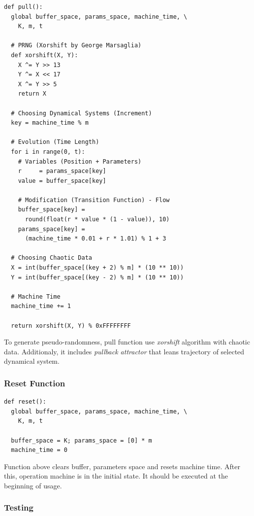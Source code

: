 \documentclass[twocolumn, a4paper, 10pt]{article}
\begin{document}
\begin{lstlisting}[style=codeAppendix, numbers=none]
def pull():
  global buffer_space, params_space, machine_time, \
    K, m, t

  # PRNG (Xorshift by George Marsaglia)
  def xorshift(X, Y):
    X ^= Y >> 13
    Y ^= X << 17
    X ^= Y >> 5
    return X

  # Choosing Dynamical Systems (Increment)
  key = machine_time % m

  # Evolution (Time Length)
  for i in range(0, t):
    # Variables (Position + Parameters)
    r     = params_space[key]
    value = buffer_space[key]

    # Modification (Transition Function) - Flow
    buffer_space[key] =
      round(float(r * value * (1 - value)), 10)
    params_space[key] =
      (machine_time * 0.01 + r * 1.01) % 1 + 3

  # Choosing Chaotic Data
  X = int(buffer_space[(key + 2) % m] * (10 ** 10))
  Y = int(buffer_space[(key - 2) % m] * (10 ** 10))

  # Machine Time
  machine_time += 1

  return xorshift(X, Y) % 0xFFFFFFFF
\end{lstlisting}

To generate pseudo-randomness, pull function use \textit{xorshift} algorithm with chaotic data. Additionaly, it includes \textit{pullback attractor} that leans trajectory of selected dynamical system.

\subsubsection{Reset Function}

\begin{lstlisting}[style=codeAppendix, numbers=none]
def reset():
  global buffer_space, params_space, machine_time, \
    K, m, t

  buffer_space = K; params_space = [0] * m
  machine_time = 0
\end{lstlisting}

Function above clears buffer, parameters space and resets machine time. After this, operation machine is in the initial state. It should be executed at the beginning of usage.

\vfill\eject

\subsubsection{Testing}
\end{document}
